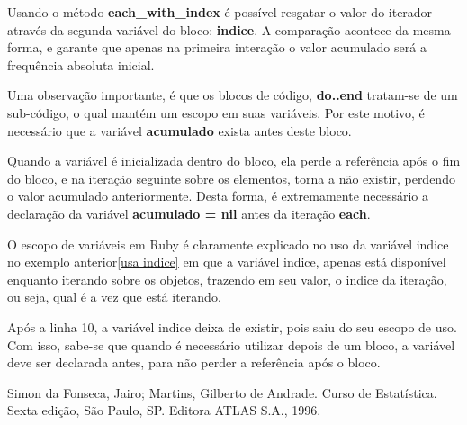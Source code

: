\documentclass[espaco=simples,appendix=Name]{abnt}
\newcommand{\code}[1] {\textbf{#1}}
\begin{document}
Usando o método \code{each\_with\_index} é possível resgatar o valor do iterador através da segunda variável do bloco: \code{indice}. A comparação acontece da mesma forma, e garante que apenas na primeira interação o valor acumulado será a frequência absoluta inicial.

Uma observação importante, é que os blocos de código, \code{do..end} tratam-se de um sub-código, o qual mantém um escopo em suas variáveis. Por este motivo, é necessário que a variável \code{acumulado} exista antes deste bloco. 

Quando a variável é inicializada dentro do bloco, ela perde a referência após o fim do bloco, e na iteração seguinte sobre os elementos, torna a não existir, perdendo o valor acumulado anteriormente. Desta forma, é extremamente necessário a declaração da variável \code{acumulado = nil} antes da iteração \code{each}.

O escopo de variáveis em Ruby é claramente explicado no uso da variável indice no exemplo anterior\ref{usa indice} em que a variável indice, apenas está disponível enquanto iterando sobre os objetos, trazendo em seu valor, o indice da iteração, ou seja, qual é a vez que está iterando.

Após a linha 10, a variável indice deixa de existir, pois saiu do seu escopo de uso. Com isso, sabe-se que quando é necessário utilizar depois de um bloco, a variável deve ser declarada antes, para não perder a referência após o bloco.



\begin{thebibliography}{9}

Simon da Fonseca, Jairo; Martins, Gilberto de Andrade.
Curso de Estatística.
Sexta edição, São Paulo, SP. Editora ATLAS S.A., 1996.
\end{thebibliography} 
\end{document}
